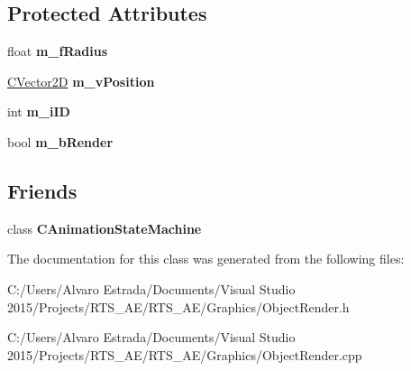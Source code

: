 \subsection*{Protected Attributes}
\begin{DoxyCompactItemize}
\item 
float {\bfseries m\+\_\+f\+Radius}\hypertarget{class_c_object_render_a428daeade6389d2a57fbabe09c5cc8a6}{}\label{class_c_object_render_a428daeade6389d2a57fbabe09c5cc8a6}

\item 
\hyperlink{struct_c_vector2_d}{C\+Vector2D} {\bfseries m\+\_\+v\+Position}\hypertarget{class_c_object_render_ae5c8f80c4dff30f60973c5fd88285d73}{}\label{class_c_object_render_ae5c8f80c4dff30f60973c5fd88285d73}

\item 
int {\bfseries m\+\_\+i\+ID}\hypertarget{class_c_object_render_a42bc0e4ba1f58937d93ad3f836eb90a2}{}\label{class_c_object_render_a42bc0e4ba1f58937d93ad3f836eb90a2}

\item 
bool {\bfseries m\+\_\+b\+Render}\hypertarget{class_c_object_render_a725d52d2016235d0bd795697821076a9}{}\label{class_c_object_render_a725d52d2016235d0bd795697821076a9}

\end{DoxyCompactItemize}
\subsection*{Friends}
\begin{DoxyCompactItemize}
\item 
class {\bfseries C\+Animation\+State\+Machine}\hypertarget{class_c_object_render_aeddc3a6d993f0bf9fcd96f4b73a3a871}{}\label{class_c_object_render_aeddc3a6d993f0bf9fcd96f4b73a3a871}

\end{DoxyCompactItemize}


The documentation for this class was generated from the following files\+:\begin{DoxyCompactItemize}
\item 
C\+:/\+Users/\+Alvaro Estrada/\+Documents/\+Visual Studio 2015/\+Projects/\+R\+T\+S\+\_\+\+A\+E/\+R\+T\+S\+\_\+\+A\+E/\+Graphics/Object\+Render.\+h\item 
C\+:/\+Users/\+Alvaro Estrada/\+Documents/\+Visual Studio 2015/\+Projects/\+R\+T\+S\+\_\+\+A\+E/\+R\+T\+S\+\_\+\+A\+E/\+Graphics/Object\+Render.\+cpp\end{DoxyCompactItemize}
